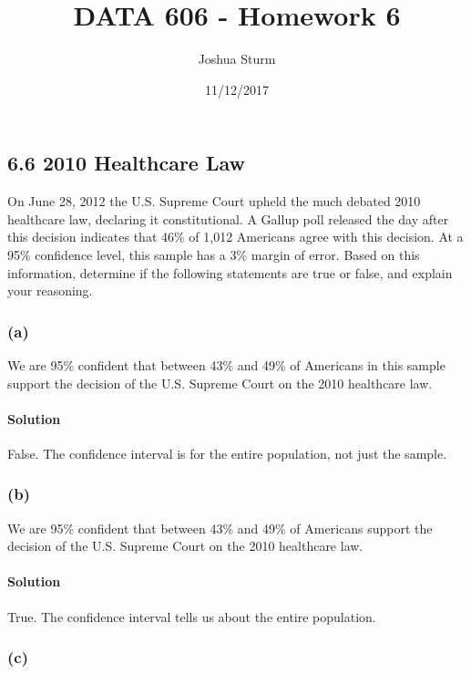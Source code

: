 \documentclass[]{article}
\title{DATA 606 - Homework 6}
\author{Joshua Sturm}
\date{11/12/2017}
\let\oldparagraph\paragraph
\renewcommand{\paragraph}[1]{\oldparagraph{#1}\mbox{}}
\begin{document}
\maketitle

\subsection{6.6 2010 Healthcare Law}\label{healthcare-law}

On June 28, 2012 the U.S. Supreme Court upheld the much debated 2010
healthcare law, declaring it constitutional. A Gallup poll released the
day after this decision indicates that 46\% of 1,012 Americans agree
with this decision. At a 95\% confidence level, this sample has a 3\%
margin of error. Based on this information, determine if the following
statements are true or false, and explain your reasoning.

\subsubsection{(a)}\label{a}

We are 95\% confident that between 43\% and 49\% of Americans in this
sample support the decision of the U.S. Supreme Court on the 2010
healthcare law.

\paragraph{Solution}\label{solution}

False. The confidence interval is for the entire population, not just
the sample.

\subsubsection{(b)}\label{b}

We are 95\% confident that between 43\% and 49\% of Americans support
the decision of the U.S. Supreme Court on the 2010 healthcare law.

\paragraph{Solution}\label{solution-1}

True. The confidence interval tells us about the entire population.

\subsubsection{(c)}\label{c}
\end{document}
